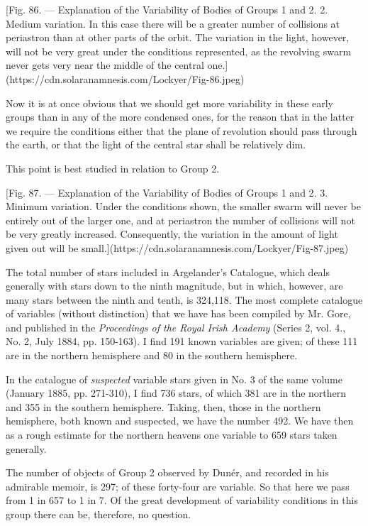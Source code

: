 \documentclass[a4paper, 12pt, oneside, polutonikogreek, english]{article}
\begin{document}
[Fig. 86. --- Explanation of the Variability of Bodies of Groups 1 and 2. 2. Medium variation. In this case there will be a greater number of collisions at periastron than at other parts of the orbit. The variation in the light, however, will not be very great under the conditions represented, as the revolving swarm never gets very near the middle of the central one.](https://cdn.solaranamnesis.com/Lockyer/Fig-86.jpeg)

Now it is at once obvious that we should get more variability in these early groups than in any of the more condensed ones, for the reason that in the latter we require the conditions either that the plane of revolution should pass through the earth, or that the light of the central star shall be relatively dim.

This point is best studied in relation to Group 2.

[Fig. 87. --- Explanation of the Variability of Bodies of Groups 1 and 2. 3. Minimum variation. Under the conditions shown, the smaller swarm will never be entirely out of the larger one, and at periastron the number of collisions will not be very greatly increased. Consequently, the variation in the amount of light given out will be small.](https://cdn.solaranamnesis.com/Lockyer/Fig-87.jpeg)

The total number of stars included in Argelander's Catalogue, which deals generally with stars down to the ninth magnitude, but in which, however, are many stars between the ninth and tenth, is 324,118. The most complete catalogue of variables (without distinction) that we have has been compiled by Mr. Gore, and published in the \emph{Proceedings of the Royal Irish Academy} (Series 2, vol. 4., No. 2, July 1884, pp. 150-163). I find 191 known variables are given; of these 111 are in the northern hemisphere and 80 in the southern hemisphere.

In the catalogue of \emph{suspected} variable stars given in No. 3 of the same volume (January 1885, pp. 271-310), I find 736 stars, of which 381 are in the northern and 355 in the southern hemisphere. Taking, then, those in the northern hemisphere, both known and suspected, we have the number 492. We have then as a rough estimate for the northern heavens one variable to 659 stars taken generally.

The number of objects of Group 2 observed by Dunér, and recorded in his admirable memoir, is 297; of these forty-four are variable. So that here we pass from 1 in 657 to 1 in 7. Of the great development of variability conditions in this group there can be, therefore, no question.
\end{document}

